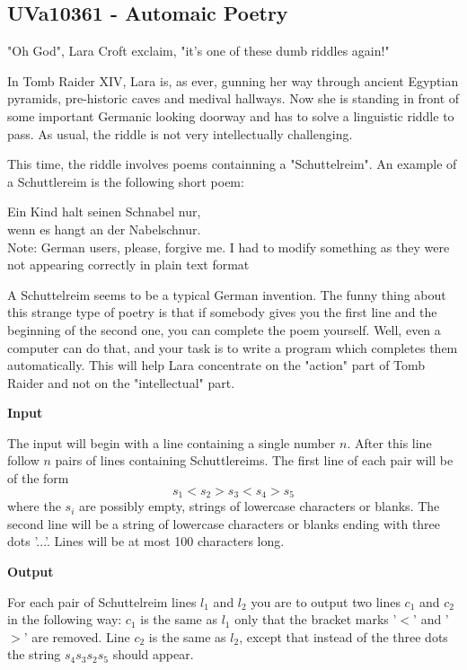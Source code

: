 \subsection{UVa10361 - Automaic Poetry}
"Oh God", Lara Croft exclaim, "it's one of these dumb riddles again!"

In Tomb Raider XIV, Lara is, as ever, gunning her way through ancient Egyptian pyramids, pre-historic caves and medival hallways. Now she is standing in front of some important Germanic looking doorway and has to solve a linguistic riddle to pass. As usual, the riddle is not very intellectually challenging.

This time, the riddle involves poems containning a "Schuttelreim". An example of a Schuttlereim is the following short poem:

Ein Kind halt seinen Schnabel nur,\\
wenn es hangt an der Nabelschnur.\\

Note: German users, please, forgive me. I had to modify something as they were not appearing correctly in plain text format

A Schuttelreim seems to be a typical German invention. The funny thing about this strange type of poetry is that if somebody gives you the first line and the beginning of the second one, you can complete the poem yourself. Well, even a computer can do that, and your task is to write a program which completes them automatically. This will help Lara concentrate on the "action" part of Tomb Raider and not on the "intellectual" part.

\begin{flushleft}
{\color{red} \textbf{Input}}
\end{flushleft}
The input will begin with a line containing a single number $n$. After this line follow $n$ pairs of lines containing Schuttlereims. The first line of each pair will be of the form
\[s_1 < s_2> s_3 <s_4> s_5\]
where the $s_i$ are possibly empty, strings of lowercase characters or blanks. The second line will be a string of lowercase characters or blanks ending with three dots '...'. Lines will be at most 100 characters long.

\begin{flushleft}
{\color{red} \textbf{Output}}
\end{flushleft}
For each pair of Schuttelreim lines $l_1$ and $l_2$ you are to output two lines $c_1$ and $c_2$ in the following way: $c_1$ is the same as $l_1$ only that the bracket marks '$<$' and '$>$' are removed. Line $c_2$ is the same as $l_2$, except that instead of the three dots the string $s_4 s_3 s_2 s_5$ should appear.

